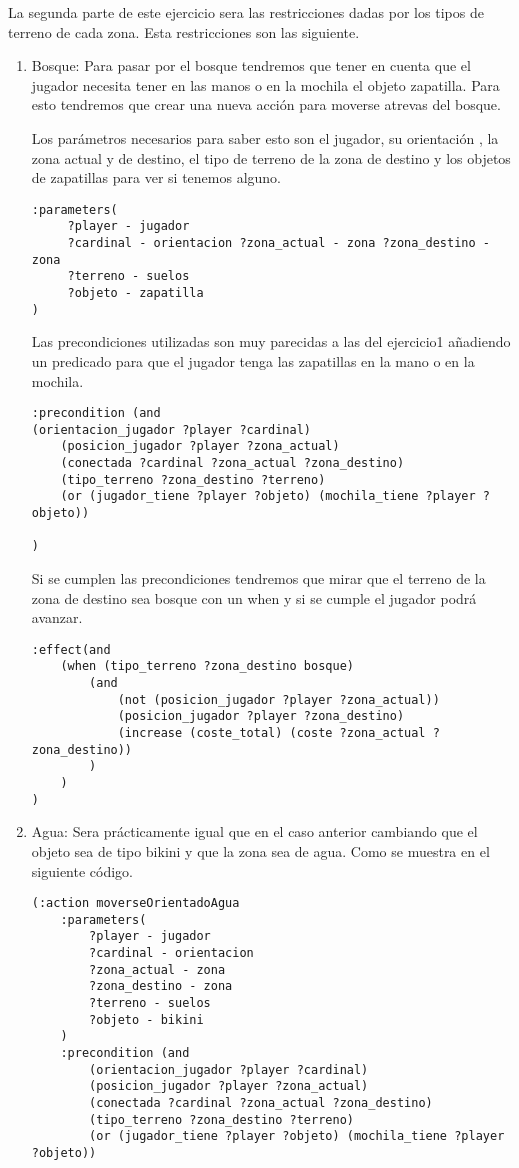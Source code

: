 \documentclass[]{article}
\begin{document}
La segunda parte de este ejercicio sera las restricciones dadas por los tipos de terreno de cada zona. Esta restricciones son las siguiente.

\begin{enumerate}
	\item {Bosque: } Para pasar por el bosque tendremos que tener en cuenta que el jugador necesita tener en las manos o en la mochila el objeto zapatilla. Para esto tendremos que crear una nueva acción para moverse atrevas del bosque.
	
	Los parámetros necesarios para saber esto son el jugador, su orientación , la zona actual y de destino, el tipo de terreno de la zona de destino y los objetos de zapatillas para ver si tenemos alguno.
	
	\begin{lstlisting}
:parameters(
	 ?player - jugador
	 ?cardinal - orientacion ?zona_actual - zona ?zona_destino - zona  
	 ?terreno - suelos 
	 ?objeto - zapatilla
)

	\end{lstlisting}
Las precondiciones utilizadas son muy parecidas a las del ejercicio1 añadiendo un predicado para que el jugador tenga las zapatillas en la mano o en la mochila.
	\begin{lstlisting}
:precondition (and 
(orientacion_jugador ?player ?cardinal)
	(posicion_jugador ?player ?zona_actual)
	(conectada ?cardinal ?zona_actual ?zona_destino)
	(tipo_terreno ?zona_destino ?terreno)
	(or (jugador_tiene ?player ?objeto) (mochila_tiene ?player ?objeto))

)
	\end{lstlisting}
	Si se cumplen las precondiciones tendremos que mirar que el terreno de la zona de destino sea bosque con un when y si se cumple el jugador podrá avanzar.
	\begin{lstlisting}
:effect(and 
	(when (tipo_terreno ?zona_destino bosque) 
		(and 
			(not (posicion_jugador ?player ?zona_actual))
			(posicion_jugador ?player ?zona_destino)
			(increase (coste_total) (coste ?zona_actual ?zona_destino))
		)
	)
)	
	\end{lstlisting}
\newpage	
\item{Agua:} Sera prácticamente igual que en el caso anterior cambiando que el objeto sea de tipo bikini y que la zona sea de agua. Como se muestra en el siguiente código.

\begin{lstlisting}
(:action moverseOrientadoAgua
	:parameters(
		?player - jugador 
		?cardinal - orientacion 
		?zona_actual - zona 
		?zona_destino - zona  
		?terreno - suelos 
		?objeto - bikini
	)
	:precondition (and 
		(orientacion_jugador ?player ?cardinal)
		(posicion_jugador ?player ?zona_actual)
		(conectada ?cardinal ?zona_actual ?zona_destino)
		(tipo_terreno ?zona_destino ?terreno)
		(or (jugador_tiene ?player ?objeto) (mochila_tiene ?player ?objeto))
		

\end{lstlisting}
\end{enumerate}
\end{document}

